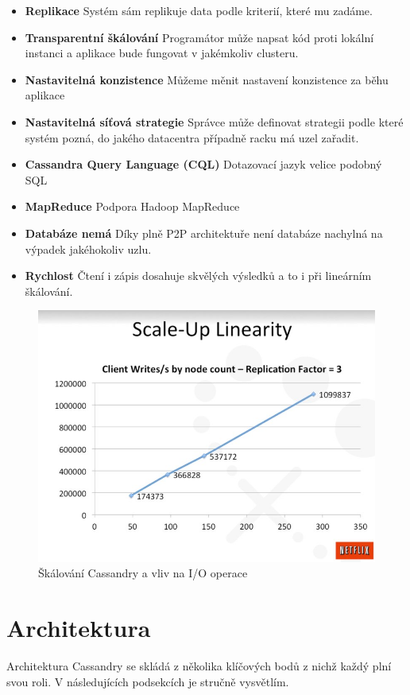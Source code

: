 \begin{itemize}
\item \textbf{Replikace} Systém sám replikuje data podle kriterií, které mu zadáme.
\item \textbf{Transparentní škálování} Programátor může napsat kód proti lokální instanci a aplikace bude fungovat v jakémkoliv clusteru.
\item \textbf{Nastavitelná konzistence} Můžeme měnit nastavení konzistence za běhu aplikace
\item \textbf{Nastavitelná síťová strategie} Správce může definovat strategii podle které systém pozná, do jakého datacentra případně racku má uzel zařadit.
\item \textbf{Cassandra Query Language (CQL)} Dotazovací jazyk velice podobný SQL
\item \textbf{MapReduce} Podpora Hadoop MapReduce
\item \textbf{Databáze nemá } Díky plně P2P architektuře není databáze  nachylná na výpadek jakéhokoliv uzlu.
\item \textbf{Rychlost} Čtení i zápis dosahuje skvělých výsledků \cite{benchmark} a to i při lineárním škálování. 
\end{itemize} 

\begin{figure}[h]
\centering
\includegraphics[scale=0.5]{images/netflix}
\caption{Škálování Cassandry a vliv na I/O operace}
\label{fig:scaleup}
\end{figure}

\section{Architektura}
Architektura Cassandry se skládá z několika klíčových bodů z nichž každý plní svou roli. V následujících podsekcích je stručně vysvětlím.

